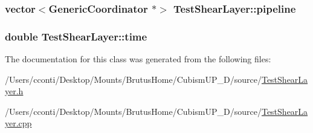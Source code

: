 \subsubsection[{pipeline}]{\setlength{\rightskip}{0pt plus 5cm}vector$<${\bf Generic\+Coordinator} $\ast$$>$ Test\+Shear\+Layer\+::pipeline\hspace{0.3cm}{\ttfamily [protected]}}\label{class_test_shear_layer_a90483bd2321290d9e491bc4cd2149327}
\hypertarget{class_test_shear_layer_a9bb6635bfe059399be2ddb9c7c198c8f}{}
\subsubsection[{time}]{\setlength{\rightskip}{0pt plus 5cm}double Test\+Shear\+Layer\+::time\hspace{0.3cm}{\ttfamily [protected]}}\label{class_test_shear_layer_a9bb6635bfe059399be2ddb9c7c198c8f}


The documentation for this class was generated from the following files\+:\begin{DoxyCompactItemize}
\item 
/\+Users/cconti/\+Desktop/\+Mounts/\+Brutus\+Home/\+Cubism\+U\+P\+\_\+D/source/\hyperlink{_test_shear_layer_8h}{Test\+Shear\+Layer.\+h}\item 
/\+Users/cconti/\+Desktop/\+Mounts/\+Brutus\+Home/\+Cubism\+U\+P\+\_\+D/source/\hyperlink{_test_shear_layer_8cpp}{Test\+Shear\+Layer.\+cpp}\end{DoxyCompactItemize}
